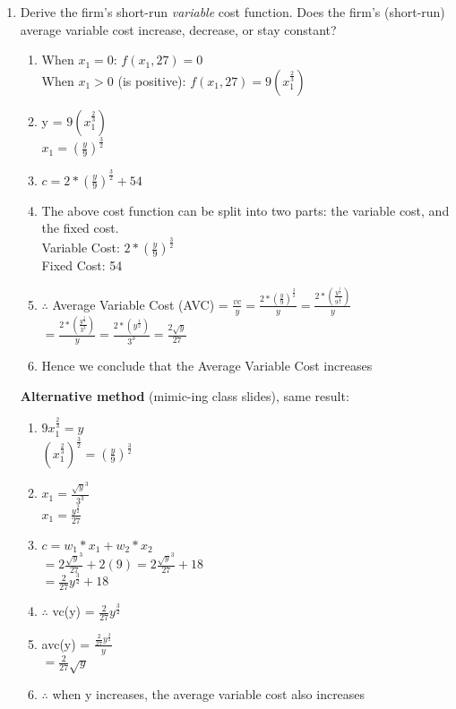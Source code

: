 \documentclass[11pt]{article}
\begin{document}
\begin{enumerate}
\begin{enumerate}
        \item Derive the firm's short-run \emph{variable} cost function. Does the firm's (short-run) average variable cost increase, decrease, or stay constant?
        \begin{enumerate}
            \item When $x_1 = 0$: $f(x_1,27) = 0$\\
            When $x_1 > 0$ (is positive): $f(x_1,27) = 9(x_1^{\frac{2}{3}})$
            \item y = $9(x_1^{\frac{2}{3}})$\\
            $x_1 = (\frac{y}{9})^{\frac{3}{2}}$
            \item $c = 2*(\frac{y}{9})^{\frac{3}{2}}+54$
            \item The above cost function can be split into two parts: the variable cost, and the fixed cost. \\
            Variable Cost: $2*(\frac{y}{9})^{\frac{3}{2}}$\\
            Fixed Cost: 54
            \item $\therefore$ Average Variable Cost (AVC) = $\frac{vc}{y}=\frac{2*(\frac{y}{9})^{\frac{3}{2}}}{y} = \frac{2*(\frac{y^{\frac{3}{2}}}{9^{\frac{3}{2}}})}{y}$\\
            $= \frac{2*(\frac{y^{\frac{3}{2}}}{3^{3}})}{y} = \frac{2*(y^{\frac{1}{2}})}{3^{3}} = \frac{2\sqrt{y}}{27}$
            \item Hence we conclude that the Average Variable Cost increases
        \end{enumerate}
        \textbf{Alternative method} (mimic-ing class slides), same result:
        \begin{enumerate}
            \item $9x_1^{\frac{2}{3}} = y$\\
            $(x_1^{\frac{2}{3}})^{\frac{3}{2}} = (\frac{y}{9})^{\frac{3}{2}}$
            \item $x_1 = \frac{\sqrt{y}^3}{3^3}$\\
            $x_1 = \frac{y^{\frac{3}{2}}}{27}$
            \item $c = w_1 * x_1 + w_2*x_2$\\
            $=2\frac{\sqrt{y}^3}{27} + 2(9)=2\frac{\sqrt{y}^3}{27} + 18$\\
            $=\frac{2}{27}y^{\frac{3}{2}}+18$
            \item $\therefore$ vc(y) = $\frac{2}{27}y^{\frac{3}{2}}$
            \item avc(y) = $\frac{\frac{2}{27}y^{\frac{3}{2}}}{y}$\\
            $=\frac{2}{27}\sqrt{y}$
            \item $\therefore$ when y increases, the average variable cost also increases
        \end{enumerate}


\end{enumerate}
\end{enumerate}
\end{document}
